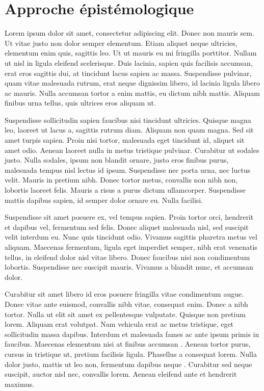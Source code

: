 \documentclass[a4paper, 11pt]{report}
\begin{document}
\section{Approche épistémologique}
Lorem ipsum dolor sit amet, consectetur adipiscing elit. Donec non mauris sem. Ut vitae justo non dolor semper elementum. Etiam aliquet neque ultricies, elementum enim quis, sagittis leo. Ut ut mauris eu mi fringilla porttitor. Nullam ut nisl in ligula eleifend scelerisque. Duis lacinia, sapien quis facilisis accumsan, erat eros sagittis dui, at tincidunt lacus sapien ac massa. Suspendisse pulvinar, quam vitae malesuada rutrum, erat neque dignissim libero, id lacinia ligula libero ac mauris. Nulla accumsan tortor a enim mattis, eu dictum nibh mattis. Aliquam finibus urna tellus, quis ultrices eros aliquam ut.

Suspendisse sollicitudin sapien faucibus nisi tincidunt ultricies. Quisque magna leo, laoreet ut lacus a, sagittis rutrum diam. Aliquam non quam magna. Sed sit amet turpis sapien. Proin nisi tortor, malesuada eget tincidunt id, aliquet sit amet odio. Aenean laoreet nulla in metus tristique pulvinar. Curabitur ut sodales justo. Nulla sodales, ipsum non blandit ornare, justo eros finibus purus, malesuada tempus nisl lectus id ipsum. Suspendisse nec porta urna, nec luctus velit. Mauris in pretium nibh. Donec tortor metus, convallis non nibh non, lobortis laoreet felis. Mauris a risus a purus dictum ullamcorper. Suspendisse mattis dapibus sapien, id semper dolor ornare eu. Nulla facilisi.

Suspendisse sit amet posuere ex, vel tempus sapien. Proin tortor orci, hendrerit et dapibus vel, fermentum sed felis. Donec aliquet malesuada nisl, sed suscipit velit interdum eu. Nunc quis tincidunt odio. Vivamus sagittis pharetra metus vel aliquam. Maecenas fermentum, ligula eget imperdiet semper, nibh erat venenatis tellus, in eleifend dolor nisl vitae libero. Donec faucibus nisi non condimentum lobortis. Suspendisse nec suscipit mauris. Vivamus a blandit nunc, et accumsan dolor.

Curabitur sit amet libero id eros posuere fringilla vitae condimentum augue. Donec vitae ante euismod, convallis nibh vitae, consequat enim. Donec a nibh tortor. Nulla ut elit sit amet ex pellentesque vulputate. Quisque non pretium lorem. Aliquam erat volutpat. Nam vehicula erat ac metus tristique, eget sollicitudin massa dapibus. Interdum et malesuada fames ac ante ipsum primis in faucibus. Maecenas elementum nisi at finibus accumsan \citet[pp. 132-137]{esl}. Aenean tortor purus, cursus in tristique ut, pretium facilisis ligula. Phasellus a consequat lorem. Nulla dolor justo, mattis ut leo non, fermentum dapibus neque \citep[pp. 132-137]{besnier}. Curabitur sed neque suscipit, auctor nisl nec, convallis lorem. Aenean eleifend ante et hendrerit maximus.
\end{document}
